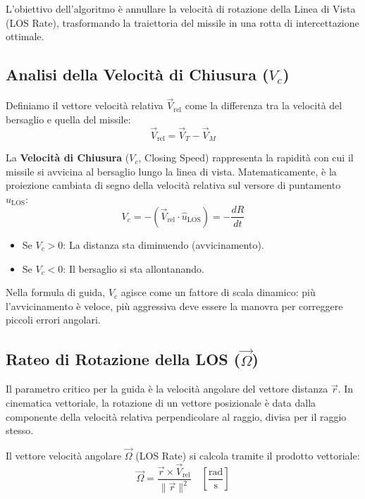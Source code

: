 \documentclass[12pt,a4paper]{article}
\begin{document}
L'obiettivo dell'algoritmo è annullare la velocità di rotazione della Linea di Vista (LOS Rate), trasformando la traiettoria del missile in una rotta di intercettazione ottimale.

\subsection{Analisi della Velocità di Chiusura ($V_c$)}
Definiamo il vettore velocità relativa $\vec{V}_{\text{rel}}$ come la differenza tra la velocità del bersaglio e quella del missile:
\begin{equation}
    \vec{V}_{\text{rel}} = \vec{V}_T - \vec{V}_M
\end{equation}

La \textbf{Velocità di Chiusura} ($V_c$, Closing Speed) rappresenta la rapidità con cui il missile si avvicina al bersaglio lungo la linea di vista. Matematicamente, è la proiezione cambiata di segno della velocità relativa sul versore di puntamento $\hat{u}_{\text{LOS}}$:
\begin{equation}
    V_c = - (\vec{V}_{\text{rel}} \cdot \hat{u}_{\text{LOS}}) = - \frac{dR}{dt}
\end{equation}
\begin{itemize}
    \item Se $V_c > 0$: La distanza sta diminuendo (avvicinamento).
    \item Se $V_c < 0$: Il bersaglio si sta allontanando.
\end{itemize}
Nella formula di guida, $V_c$ agisce come un fattore di scala dinamico: più l'avvicinamento è veloce, più aggressiva deve essere la manovra per correggere piccoli errori angolari.

\subsection{Rateo di Rotazione della LOS ($\vec{\Omega}$)}
Il parametro critico per la guida è la velocità angolare del vettore distanza $\vec{r}$.
In cinematica vettoriale, la rotazione di un vettore posizionale è data dalla componente della velocità relativa perpendicolare al raggio, divisa per il raggio stesso.

Il vettore velocità angolare $\vec{\Omega}$ (LOS Rate) si calcola tramite il prodotto vettoriale:
\begin{equation}
    \vec{\Omega} = \frac{\vec{r} \times \vec{V}_{\text{rel}}}{\|\vec{r}\|^2} \quad \left[ \frac{\text{rad}}{\text{s}} \right]
\end{equation}
\end{document}
